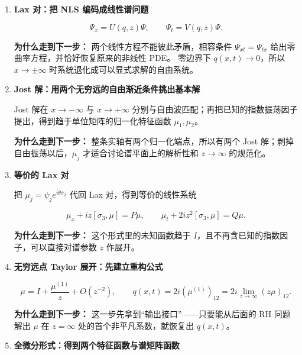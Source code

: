\documentclass[
    lang=cn,
    scheme=chinese,
    mode=simple,
    device=normal,
    color=blue,
    math=cm,
    thmcnt=section,
    12pt,
    nowatermark
]{elegantbook}
\begin{document}
\begin{enumerate}[(1)]

    \item \textbf{Lax 对：把 NLS 编码成线性谱问题}

          \[
              \Psi_x=U(q,z)\Psi,
              \qquad
              \Psi_t=V(q,z)\Psi.
          \]

          \textbf{为什么走到下一步：}
          两个线性方程不能彼此矛盾，相容条件 $\Psi_{xt}=\Psi_{tx}$ 给出零曲率方程，并恰好恢复原来的非线性 PDE。
          零边界下 $q(x,t)\to0$，所以 $x\to\pm\infty$ 时系统退化成可以显式求解的自由系统。

    \item \textbf{Jost 解：用两个无穷远的自由渐近条件挑出基本解}

          Jost 解在 $x\to-\infty$ 与 $x\to+\infty$ 分别与自由波匹配；再把已知的指数振荡因子提出，得到趋于单位矩阵的归一化特征函数 $\mu_1,\mu_2$。

          \textbf{为什么走到下一步：}
          整条实轴有两个归一化端点，所以有两个 Jost 解；剥掉自由振荡以后，$\mu_j$ 才适合讨论谱平面上的解析性和 $z\to\infty$ 的规范化。

    \item \textbf{等价的 Lax 对}

          把 $\mu_j=\psi_j e^{i\theta\sigma_3}$ 代回 Lax 对，得到等价的线性系统

          \[
              \mu_x+iz[\sigma_3,\mu]=P\mu,
              \qquad
              \mu_t+2iz^2[\sigma_3,\mu]=Q\mu.
          \]

          \textbf{为什么走到下一步：}
          这个形式里的未知函数趋于 $I$，且不再含已知的指数因子，可以直接对谱参数 $z$ 作展开。

    \item \textbf{无穷远点 Taylor 展开：先建立重构公式}

          \[
              \mu
              =I+\dfrac{\mu^{(1)}}{z}+O(z^{-2}),
              \qquad
              q(x,t)
              =2i(\mu^{(1)})_{12}
              =2i\lim\limits_{z\to\infty}(z\mu)_{12}.
          \]

          \textbf{为什么走到下一步：}
          这一步先拿到``输出接口''——只要能从后面的 RH 问题解出 $\mu$ 在 $z=\infty$ 处的首个非平凡系数，就恢复出 $q(x,t)$。

    \item \textbf{全微分形式：得到两个特征函数与谱矩阵函数}


\end{enumerate}
\end{document}
